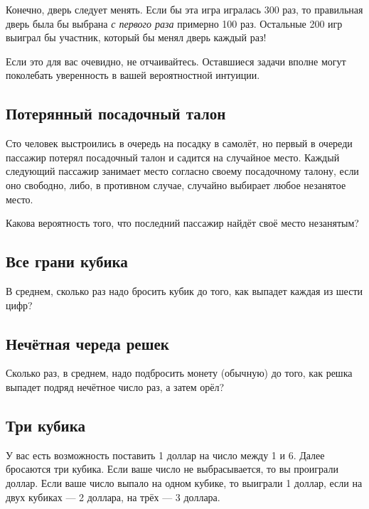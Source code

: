 Конечно, дверь следует менять.
Если бы эта игра игралась 300 раз, то правильная дверь была бы выбрана \emph{с первого раза} примерно 100 раз.
Остальные 200 игр выиграл бы участник, который бы менял дверь каждый раз!

\medskip

Если это для вас очевидно, не отчаивайтесь. %
Оставшиеся задачи вполне могут поколебать уверенность в вашей вероятностной интуиции.

\subsection*{Потерянный посадочный талон}%

Сто человек выстроились в очередь на посадку в самолёт, но первый в очереди пассажир потерял посадочный талон и садится на случайное место.
Каждый следующий пассажир занимает место согласно своему посадочному талону, если оно свободно, либо, в противном случае, случайно выбирает любое незанятое место.

\medskip

Какова вероятность того, что последний пассажир найдёт своё место незанятым?

\subsection*{Все грани кубика}%

В среднем, сколько раз надо бросить кубик до того, как выпадет каждая из шести цифр?

\subsection*{Нечётная череда решек}%

Сколько раз, в среднем, надо подбросить монету (обычную) до того, как решка выпадет подряд нечётное число раз, а затем орёл? 

\subsection*{Три кубика}%

У вас есть возможность поставить 1 доллар на число между 1 и 6.
Далее бросаются три кубика.
Если ваше число не выбрасывается, то вы проиграли доллар.
Если ваше число выпало на одном кубике, то выиграли 1 доллар, если на двух кубиках --- 2 доллара, на трёх --- 3 доллара.

